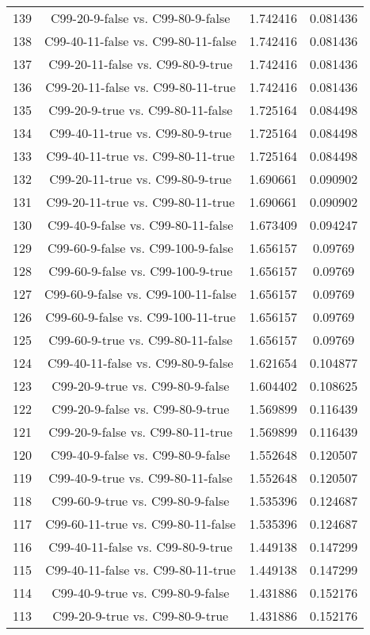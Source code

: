 \documentclass[a4paper,10pt]{article}
\begin{document}
\begin{landscape}
\begin{table}[!htp]
\begin{tabular}{cccc}
139&C99-20-9-false vs. C99-80-9-false&1.742416&0.081436\\
138&C99-40-11-false vs. C99-80-11-false&1.742416&0.081436\\
137&C99-20-11-false vs. C99-80-9-true&1.742416&0.081436\\
136&C99-20-11-false vs. C99-80-11-true&1.742416&0.081436\\
135&C99-20-9-true vs. C99-80-11-false&1.725164&0.084498\\
134&C99-40-11-true vs. C99-80-9-true&1.725164&0.084498\\
133&C99-40-11-true vs. C99-80-11-true&1.725164&0.084498\\
132&C99-20-11-true vs. C99-80-9-true&1.690661&0.090902\\
131&C99-20-11-true vs. C99-80-11-true&1.690661&0.090902\\
130&C99-40-9-false vs. C99-80-11-false&1.673409&0.094247\\
129&C99-60-9-false vs. C99-100-9-false&1.656157&0.09769\\
128&C99-60-9-false vs. C99-100-9-true&1.656157&0.09769\\
127&C99-60-9-false vs. C99-100-11-false&1.656157&0.09769\\
126&C99-60-9-false vs. C99-100-11-true&1.656157&0.09769\\
125&C99-60-9-true vs. C99-80-11-false&1.656157&0.09769\\
124&C99-40-11-false vs. C99-80-9-false&1.621654&0.104877\\
123&C99-20-9-true vs. C99-80-9-false&1.604402&0.108625\\
122&C99-20-9-false vs. C99-80-9-true&1.569899&0.116439\\
121&C99-20-9-false vs. C99-80-11-true&1.569899&0.116439\\
120&C99-40-9-false vs. C99-80-9-false&1.552648&0.120507\\
119&C99-40-9-true vs. C99-80-11-false&1.552648&0.120507\\
118&C99-60-9-true vs. C99-80-9-false&1.535396&0.124687\\
117&C99-60-11-true vs. C99-80-11-false&1.535396&0.124687\\
116&C99-40-11-false vs. C99-80-9-true&1.449138&0.147299\\
115&C99-40-11-false vs. C99-80-11-true&1.449138&0.147299\\
114&C99-40-9-true vs. C99-80-9-false&1.431886&0.152176\\
113&C99-20-9-true vs. C99-80-9-true&1.431886&0.152176\\

\end{tabular}
\end{table}
\end{landscape}
\end{document}
